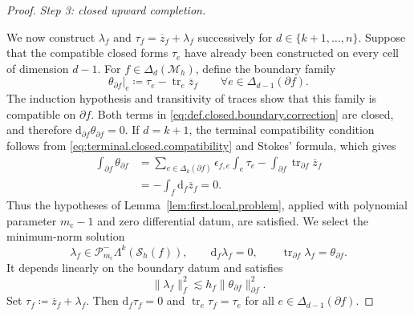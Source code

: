 \documentclass[a4paper,11pt]{article}
\theoremstyle{definition}
\newcommand{\DIFF}{\mathrm{d}}
\newcommand{\Mh}{\mathcal{M}_h}
\newcommand{\Sh}{\mathcal{S}_h}
\newcommand{\FM}[1]{\Delta_{#1}}
\newcommand{\PLtrim}[2]{\mathcal{P}_{#1}^{-}\Lambda^{#2}}
\newcommand{\trc}{\operatorname{tr}}
\begin{document}
\begin{proof}
\medskip
\noindent\emph{Step 3: closed upward completion.}

We now construct $\lambda_f$ and $\tau_f=\overline z_f+\lambda_f$ successively for $d\in \{k+1,\ldots,n\}$.
Suppose that the compatible closed forms $\tau_e$ have already been constructed on every cell of dimension $d-1$.
For $f\in\FM{d}(\Mh)$, define the boundary family
\begin{equation}
\label{eq:def.closed.boundary.correction}
  \left.\theta_{\partial f}\right|_e
  \coloneqq
  \tau_e-\trc_e\overline z_f
  \qquad
  \forall e\in\FM{d-1}(\partial f).
\end{equation}
The induction hypothesis and transitivity of traces show that this family is compatible on $\partial f$.
Both terms in \eqref{eq:def.closed.boundary.correction} are closed, and therefore $\DIFF_{\partial f}\theta_{\partial f}=0$.
If $d=k+1$, the terminal compatibility condition follows from \eqref{eq:terminal.closed.compatibility} and Stokes' formula, which gives
\[
\begin{aligned}
  \int_{\partial f}\theta_{\partial f}
  &=
  \sum_{e\in\FM{k}(\partial f)}
  \epsilon_{f,e}\int_e\tau_e
  -
  \int_{\partial f}\trc_{\partial f}\overline z_f
  \\
  &=
  -\int_f\DIFF_f\overline z_f
  =
  0.
\end{aligned}
\]
Thus the hypotheses of Lemma~\ref{lem:first.local.problem}, applied with polynomial parameter $m_{\mathrm c}-1$ and zero differential datum, are satisfied.
We select the minimum-norm solution
\begin{equation}
\label{eq:closed.upward.local.problem}
  \lambda_f
  \in
  \PLtrim{m_{\mathrm c}}{k}(\Sh(f)),
  \qquad
  \DIFF_f\lambda_f=0,
  \qquad
  \trc_{\partial f}\lambda_f
  =
  \theta_{\partial f}.
\end{equation}
It depends linearly on the boundary datum and satisfies
\begin{equation}
\label{eq:closed.upward.local.stability}
  \|\lambda_f\|_f^2
  \lesssim
  h_f
  \|\theta_{\partial f}\|_{\partial f}^2.
\end{equation}
Set $\tau_f \coloneqq \overline z_f+\lambda_f$.
Then $\DIFF_f\tau_f=0$ and $\trc_e\tau_f=\tau_e$ for all $e\in\FM{d-1}(\partial f)$.



\end{proof}
\end{document}
